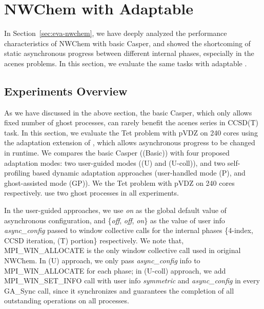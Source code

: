 \section{NWChem with Adaptable \libname}\label{sec:eva-nwchem-adpt}
In Section~\ref{sec:eva-nwchem}, we have deeply analyzed the performance
characteristics of NWChem with basic Casper, and showed the shortcoming
of static asynchronous progress between different internal phases,
especially in the acenes problems. In this section, we evaluate the same
tasks with adaptable \libname.

\subsection{Experiments Overview}

As we have discussed in the above section, the basic Casper, which only
allows fixed number of ghost processes, can rarely benefit the acenes
series in CCSD(T) task. In this section, we evaluate the Tet problem
with pVDZ on 240 cores using the adaptation extension of \libname,
which allows asynchronous progress to be changed in runtime.
We compares the basic Casper (\libname(Basic)) with four proposed adaptation modes:
two user-guided modes (\libname(U) and \libname(U-coll)), and two
self-profiling based dynamic adaptation approaches (user-handled
mode \libname(P), and ghost-assisted mode \libname(GP)).
We the Tet problem with pVDZ on 240 cores respectively.
use two ghost processes in all experiments.

In the user-guided approaches, we use \emph{on} as the global default
value of asynchronous configuration, and \{\emph{off}, \emph{off},
\emph{on}\} as the value of user info \emph{async\_config} passed to
window collective calls for the internal phases \{4-index, CCSD iteration,
(T) portion\} respectively. We note that, MPI\_WIN\_ALLOCATE is the only
window collective call used in original NWChem. In \libname(U) approach, we
only pass \emph{async\_config} info to MPI\_WIN\_ALLOCATE for each phase;
in \libname(U-coll) approach, we add MPI\_WIN\_SET\_INFO call with user
info \emph{symmetric} and \emph{async\_config} in every GA\_Sync call,
since it synchronizes and guarantees the completion of all outstanding
operations on all processes.

